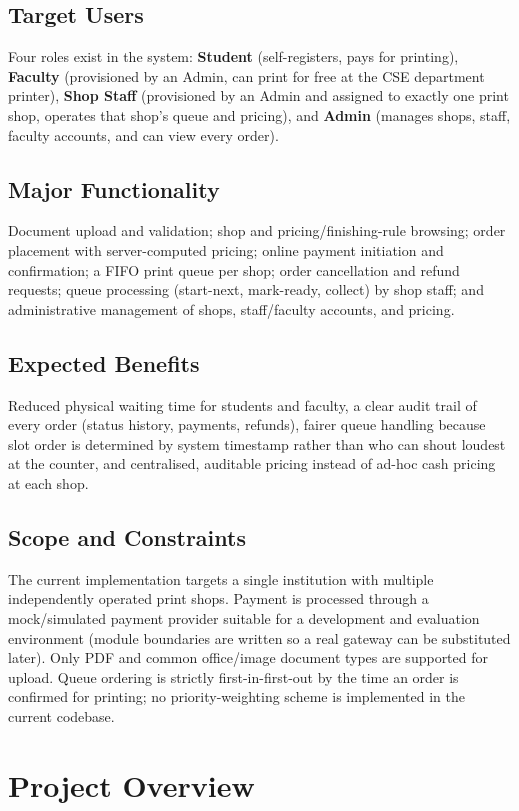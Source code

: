\documentclass[12pt,a4paper]{report}
\begin{document}
\subsection*{Target Users}
Four roles exist in the system: \textbf{Student} (self-registers, pays for printing), \textbf{Faculty} (provisioned by an Admin, can print for free at the CSE department printer), \textbf{Shop Staff} (provisioned by an Admin and assigned to exactly one print shop, operates that shop's queue and pricing), and \textbf{Admin} (manages shops, staff, faculty accounts, and can view every order).

\subsection*{Major Functionality}
Document upload and validation; shop and pricing/finishing-rule browsing; order placement with server-computed pricing; online payment initiation and confirmation; a FIFO print queue per shop; order cancellation and refund requests; queue processing (start-next, mark-ready, collect) by shop staff; and administrative management of shops, staff/faculty accounts, and pricing.

\subsection*{Expected Benefits}
Reduced physical waiting time for students and faculty, a clear audit trail of every order (status history, payments, refunds), fairer queue handling because slot order is determined by system timestamp rather than who can shout loudest at the counter, and centralised, auditable pricing instead of ad-hoc cash pricing at each shop.

\subsection*{Scope and Constraints}
The current implementation targets a single institution with multiple independently operated print shops. Payment is processed through a mock/simulated payment provider suitable for a development and evaluation environment (module boundaries are written so a real gateway can be substituted later). Only PDF and common office/image document types are supported for upload. Queue ordering is strictly first-in-first-out by the time an order is confirmed for printing; no priority-weighting scheme is implemented in the current codebase.

\section{Project Overview}
\end{document}

